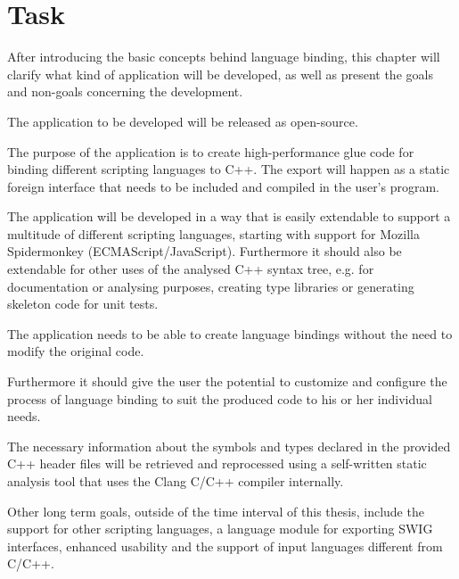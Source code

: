 \chapter{Task}
\label{chap:Task}

After introducing the basic concepts behind language binding, this chapter will clarify what kind of application will be developed, as well as present the goals and non-goals concerning the development.

The application to be developed will be released as open-source.

The purpose of the application is to create high-performance glue code for binding different scripting languages to C++. The export will happen as a static foreign interface that needs to be included and compiled in the user's program.

The application will be developed in a way that is easily extendable to support a multitude of different scripting languages, starting with support for Mozilla Spidermonkey (ECMAScript/JavaScript). Furthermore it should also be extendable for other uses of the analysed C++ syntax tree, e.g. for documentation or analysing purposes, creating type libraries or generating skeleton code for unit tests.

The application needs to be able to create language bindings without the need to modify the original code.

Furthermore it should give the user the potential to customize and configure the process of language binding to suit the produced code to his or her individual needs.

The necessary information about the symbols and types declared in the provided C++ header files will be retrieved and reprocessed using a self-written static analysis tool that uses the Clang C/C++ compiler internally.

Other long term goals, outside of the time interval of this thesis, include the support for other scripting languages, a language module for exporting SWIG interfaces, enhanced usability and the support of input languages different from C/C++.